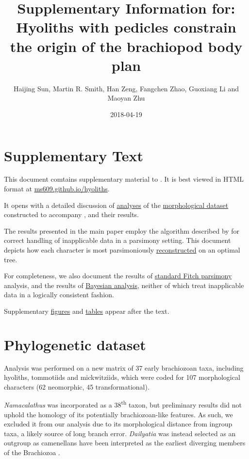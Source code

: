 \documentclass[openany]{book}
\title{Supplementary Information for: \newline\newline Hyoliths with pedicles
constrain the origin of the brachiopod body plan}
\author{Haijing Sun, Martin R. Smith, Han Zeng, Fangchen Zhao, Guoxiang Li and
Maoyan Zhu}
\date{2018-04-19}
\theoremstyle{definition}
\theoremstyle{definition}
\theoremstyle{definition}
\theoremstyle{remark}
\begin{document}
\maketitle

{
\setcounter{tocdepth}{1}
\tableofcontents
}
\chapter*{Supplementary Text}\label{supplementary-text}

This document comtains supplementary material to
\citet{Sun2018Hyolithswith}. It is best viewed in HTML format at
\href{https://ms609.github.io/hyoliths/}{ms609.github.io/hyoliths}.

It opens with a detailed discussion of
\protect\hyperlink{treesearch}{analyses} of the
\protect\hyperlink{dataset}{morphological dataset} constructed to
accompany , and their results.

The results presented in the main paper employ the algorithm described
by \citet{Brazeau2018} for correct handling of inapplicable data in a
parsimony setting. This document depicts how each character is most
parsimoniously \protect\hyperlink{reconstructions}{reconstructed} on an
optimal tree.

For completeness, we also document the results of
\protect\hyperlink{fitch}{standard Fitch parsimony} analysis, and the
results of \protect\hyperlink{bayesian}{Bayesian analysis}, neither of
which treat inapplicable data in a logically consistent fashion.

Supplementary \protect\hyperlink{figures}{figures} and
\protect\hyperlink{tables}{tables} appear after the text.

\hypertarget{dataset}{\chapter{Phylogenetic dataset}\label{dataset}}

Analysis was performed on a new matrix of 37 early brachiozoan taxa,
including hyoliths, tommotiids and mickwitziids, which were coded for
107 morphological characters (62 neomorphic, 45 transformational).

\emph{Namacalathus} was incorporated as a 38\textsuperscript{th} taxon,
but preliminary results did not uphold the homology of its potentially
brachiozoan-like features. As such, we excluded it from our analysis due
to its morphological distance from ingroup taxa, a likely source of long
branch error. \emph{Dailyatia} was instead selected as an outgroup as
camenellans have been interpreted as the earliest diverging members of
the Brachiozoa \citep{Skovsted2015Theearly, Zhao2017}.
\end{document}
